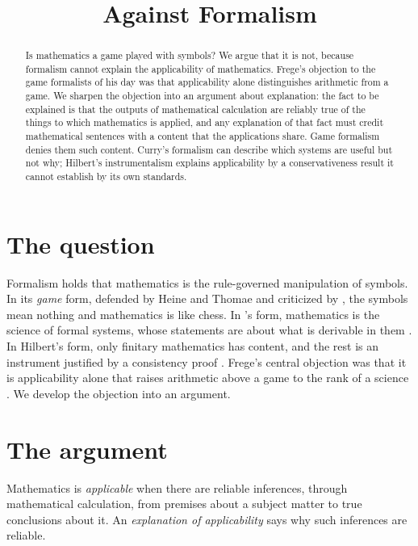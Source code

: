 \documentclass{situationist-preprint}
\title{Against Formalism}
\begin{document}
\maketitle

\begin{abstract}
Is mathematics a game played with symbols? We argue that it is not, because formalism cannot explain the applicability of mathematics. Frege's objection to the game formalists of his day was that applicability alone distinguishes arithmetic from a game. We sharpen the objection into an argument about explanation: the fact to be explained is that the outputs of mathematical calculation are reliably true of the things to which mathematics is applied, and any explanation of that fact must credit mathematical sentences with a content that the applications share. Game formalism denies them such content. Curry's formalism can describe which systems are useful but not why; Hilbert's instrumentalism explains applicability by a conservativeness result it cannot establish by its own standards.
\end{abstract}

\section{The question}

Formalism holds that mathematics is the rule-governed manipulation of symbols. In its \emph{game} form, defended by Heine and Thomae and criticized by \citet[§§86--137]{Frege1903}, the symbols mean nothing and mathematics is like chess. In \citeauthor{Curry1951}'s form, mathematics is the science of formal systems, whose statements are about what is derivable in them \citep{Curry1951}. In Hilbert's form, only finitary mathematics has content, and the rest is an instrument justified by a consistency proof \citep{Hilbert1926}. Frege's central objection was that it is applicability alone that raises arithmetic above a game to the rank of a science \citep[§91]{Frege1903}. We develop the objection into an argument.

\section{The argument}

\begin{definition}\label{d:app}
Mathematics is \emph{applicable} when there are reliable inferences, through mathematical calculation, from premises about a subject matter to true conclusions about it. An \emph{explanation of applicability} says why such inferences are reliable.
\end{definition}
\end{document}
